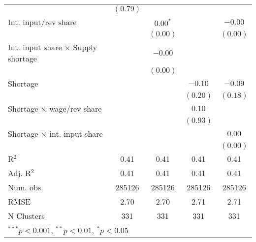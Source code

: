 \begin{tabular}{l c c c c }
                                          & $(0.79)$      &               &               &               \\
Int. input/rev share                      &               & $0.00^{*}$    &               & $-0.00$       \\
                                          &               & $(0.00)$      &               & $(0.00)$      \\
Int. input share $\times$ Supply shortage &               & $-0.00$       &               &               \\
                                          &               & $(0.00)$      &               &               \\
Shortage                                  &               &               & $-0.10$       & $-0.09$       \\
                                          &               &               & $(0.20)$      & $(0.18)$      \\
Shortage $\times$ wage/rev share          &               &               & $0.10$        &               \\
                                          &               &               & $(0.93)$      &               \\
Shortage $\times$ int. input share        &               &               &               & $0.00$        \\
                                          &               &               &               & $(0.00)$      \\
\midrule
R$^2$                                     & 0.41          & 0.41          & 0.41          & 0.41          \\
Adj. R$^2$                                & 0.41          & 0.41          & 0.41          & 0.41          \\
Num. obs.                                 & 285126        & 285126        & 285126        & 285126        \\
RMSE                                      & 2.70          & 2.70          & 2.71          & 2.71          \\
N Clusters                                & 331           & 331           & 331           & 331           \\
\bottomrule
\multicolumn{5}{l}{\tiny{$^{***}p<0.001$, $^{**}p<0.01$, $^*p<0.05$}}
\end{tabular}
